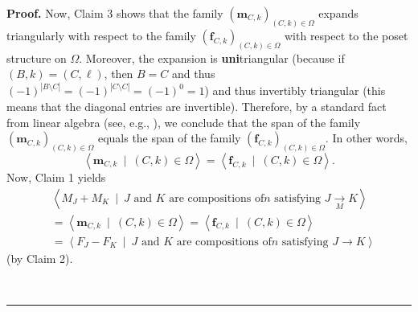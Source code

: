 \documentclass[numbers=enddot,12pt,final,onecolumn,notitlepage]{scrartcl}%
\theoremstyle{definition}
\newenvironment{proof}[1][Proof]{\noindent\textbf{#1.} }{\ \rule{0.5em}{0.5em}}
\begin{document}
\begin{proof}
Now, Claim 3 shows that the family $\left(  \mathbf{m}_{C,k}\right)  _{\left(
C,k\right)  \in\Omega}$ expands triangularly with respect to the family
$\left(  \mathbf{f}_{C,k}\right)  _{\left(  C,k\right)  \in\Omega}$ with
respect to the poset structure on $\Omega$. Moreover, the expansion is
\textbf{uni}triangular (because if $\left(  B,k\right)  =\left(
C,\ell\right)  $, then $B=C$ and thus $\left(  -1\right)  ^{\left\vert
B\setminus C\right\vert }=\left(  -1\right)  ^{\left\vert C\setminus
C\right\vert }=\left(  -1\right)  ^{0}=1$) and thus invertibly triangular
(this means that the diagonal entries are invertible). Therefore, by a
standard fact from linear algebra (see, e.g., \cite[Corollary 11.1.19
\textbf{(b)}]{HopfComb}), we conclude that the span of the family $\left(
\mathbf{m}_{C,k}\right)  _{\left(  C,k\right)  \in\Omega}$ equals the span of
the family $\left(  \mathbf{f}_{C,k}\right)  _{\left(  C,k\right)  \in\Omega}%
$. In other words,%
\[
\left\langle \mathbf{m}_{C,k}\ \mid\ \left(  C,k\right)  \in\Omega
\right\rangle =\left\langle \mathbf{f}_{C,k}\ \mid\ \left(  C,k\right)
\in\Omega\right\rangle .
\]
Now, Claim 1 yields%
\begin{align*}
&  \left\langle M_{J}+M_{K}\ \mid\ J\text{ and }K\text{ are compositions of
}n\text{ satisfying }J\underset{M}{\rightarrow}K\right\rangle \\
&  =\left\langle \mathbf{m}_{C,k}\ \mid\ \left(  C,k\right)  \in
\Omega\right\rangle =\left\langle \mathbf{f}_{C,k}\ \mid\ \left(  C,k\right)
\in\Omega\right\rangle \\
&  =\left\langle F_{J}-F_{K}\ \mid\ J\text{ and }K\text{ are compositions of
}n\text{ satisfying }J\rightarrow K\right\rangle
\end{align*}
(by Claim 2).


\end{proof}
\end{document}

